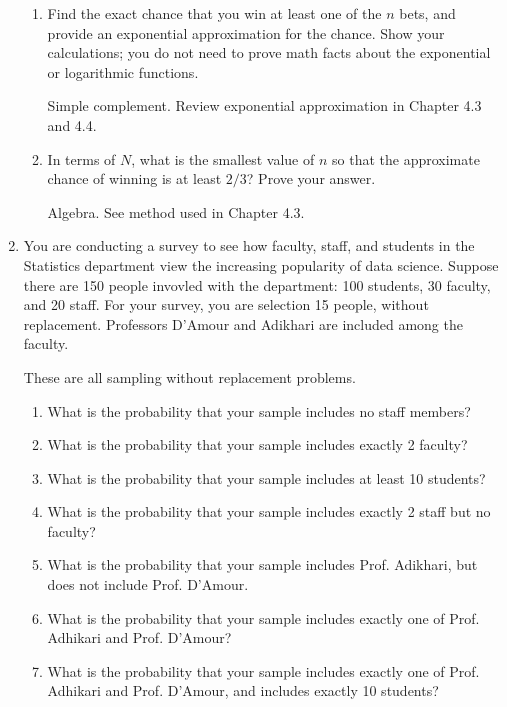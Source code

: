 \documentclass[11pt]{article}
\begin{document}
\begin{enumerate}
        \begin{enumerate}
            \item Find the exact chance that you win at least one of the $n$ bets, and provide an exponential approximation for the chance. Show your calculations; you do not need to prove math facts about the exponential or logarithmic functions.

                {\color{red} Simple complement. Review exponential approximation in Chapter 4.3 and 4.4.} 
            \item In terms of $N$, what is the smallest value of $n$ so that the approximate chance of winning is at least $2/3$? Prove your answer.

                {\color{red} Algebra. See method used in Chapter 4.3.}
        \end{enumerate}

    \item You are conducting a survey to see how faculty, staff, and students in the Statistics department view the increasing popularity of data science. Suppose there are 150 people invovled with the department: 100 students, 30 faculty, and 20 staff. For your survey, you are selection 15 people, without replacement. Professors D'Amour and Adikhari are included among the faculty.

        {\color{red} These are all sampling without replacement problems.}
        \begin{enumerate}
            \item What is the probability that your sample includes no staff members?
            \item What is the probability that your sample includes exactly 2 faculty?
            \item What is the probability that your sample includes at least 10 students?
            \item What is the probability that your sample includes exactly 2 staff but no faculty?
            \item What is the probability that your sample includes Prof. Adikhari, but does not include Prof. D'Amour.
            \item What is the probability that your sample includes exactly one of Prof. Adhikari and Prof. D'Amour?
            \item What is the probability that your sample includes exactly one of Prof. Adhikari and Prof. D'Amour, and includes exactly 10 students?
        \end{enumerate}


\end{enumerate}
\end{document}
